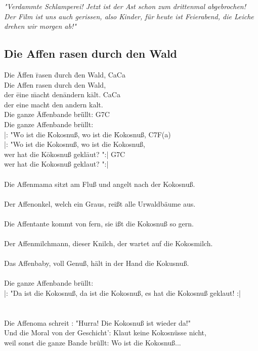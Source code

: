 \documentclass[10pt,a5paper,twoside]{scrbook}
\begin{document}
\begin{guitar}
\textit{"Verdammte Schlamperei! Jetzt ist der Ast schon zum drittenmal abgebrochen! 
Der Film ist uns auch gerissen, also Kinder, 
für heute ist Feierabend, die Leiche drehen wir morgen ab!"
}\end{guitar}

  	
  	  
     \newpage  
  	
    \subsection{Die Affen rasen durch den Wald}
  \begin{tabbing}
Die \=Affen \=rasen \=durch \=den Wald,\kill
\>C\>a\>C\>a\\
Die Affen rasen durch den Wald, \\

der \=eine \=macht den\= andern k\=alt.\kill
\>C\>a\>C\>a\\
der eine macht den andern kalt.\\


Die ganze \=Affenbande br\=üllt:\kill 
\>G7\>C\\
Die ganze Affenbande brüllt:\\ 



|: "\=Wo ist die \=Kokosnuß, wo ist die \=Kokosnuß,\kill
\>C7\>F\>(a)\\
|: "Wo ist die Kokosnuß, wo ist die Kokosnuß,\\


wer hat die K\=okosnuß gekl\=aut? ":|\kill
\>G7\>C\\
wer hat die Kokosnuß geklaut? ":|\\

\\
Die Affenmama sitzt am Fluß und angelt nach der Kokosnuß. \\
\\
Der Affenonkel, welch ein Graus, reißt alle Urwaldbäume aus.\\
\\
Die Affentante kommt von fern, sie ißt die Kokosnuß so gern.\\
\\
Der Affenmilchmann, dieser Knilch, der wartet auf die Kokosmilch.\\
\\
Das Affenbaby, voll Genuß, hält in der Hand die Kokusnuß.\\
\\
Die ganze Affenbande brüllt:\\
|: "Da ist die Kokosnuß, da ist die Kokosnuß, es hat die Kokosnuß geklaut! :| \\
\\
\\Die Affenoma schreit : "Hurra! Die Kokosnuß ist wieder da!"
\\
Und die Moral von der Geschicht': Klaut keine Kokosnüsse nicht,\\
weil sonst die ganze Bande brüllt: Wo ist die Kokosnuß...\\
\end{tabbing}
\end{document}
